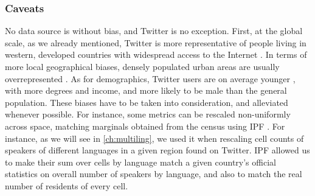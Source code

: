 \documentclass[../thesis.tex]{subfiles}
\begin{document}
\subsubsection{Caveats}
\label{sec:twitter_biases}
No data source is without bias, and Twitter is no exception. First, at the global scale,
as we already mentioned, Twitter is more representative of people living in western,
developed countries with widespread access to the Internet
\cite{HawelkaGeolocatedTwitter2014,MocanuTwitterBabel2013}. In terms of more local
geographical biases, densely populated urban areas are usually overrepresented
\cite{MisloveUnderstandingDemographics2011,JiangUnderstandingDemographic2019,AuxierSocialMedia2021}.
As for demographics, Twitter users are on average younger
\cite{NguyenHowOld2013,AuxierSocialMedia2021,SloanWhoTweets2017}, with more degrees and
income, and more likely to be male
\cite{MisloveUnderstandingDemographics2011,AuxierSocialMedia2021,SloanWhoTweets2017}
than the general population. These biases have to be taken into consideration, and
alleviated whenever possible. For instance, some metrics can be rescaled non-uniformly
across space, matching marginals obtained from the census using \ac{IPF}
\cite{DemingLeastSquares1940,FienbergIterativeProcedure1970}. For instance, as we will
see in \cref{ch:multiling}, we used it when rescaling cell counts of speakers of
different languages in a given region found on Twitter. \Ac{IPF} allowed us to make
their sum over cells by language match a given country's official statistics on overall
number of speakers by language, and also to match the real number of residents of every
cell.
\end{document}
